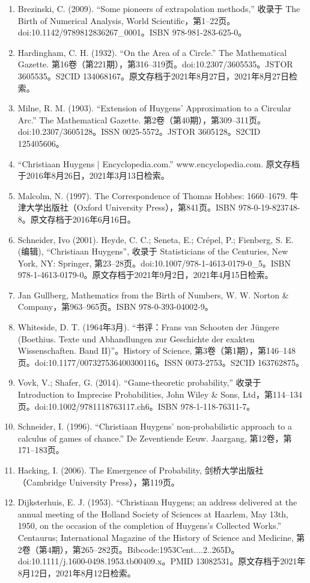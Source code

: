 \begin{enumerate}
\item Brezinski, C. (2009). “Some pioneers of extrapolation methods,” 收录于 The Birth of Numerical Analysis, World Scientific，第1–22页。doi:10.1142/9789812836267_0001。ISBN 978-981-283-625-0。
\item Hardingham, C. H. (1932). “On the Area of a Circle.” The Mathematical Gazette. 第16卷（第221期），第316–319页。doi:10.2307/3605535。JSTOR 3605535。S2CID 134068167。原文存档于2021年8月27日，2021年8月27日检索。
\item Milne, R. M. (1903). “Extension of Huygens’ Approximation to a Circular Arc.” The Mathematical Gazette. 第2卷（第40期），第309–311页。doi:10.2307/3605128。ISSN 0025-5572。JSTOR 3605128。S2CID 125405606。
\item “Christiaan Huygens | Encyclopedia.com.” www.encyclopedia.com. 原文存档于2016年8月26日，2021年3月13日检索。
\item Malcolm, N. (1997). The Correspondence of Thomas Hobbes: 1660–1679. 牛津大学出版社（Oxford University Press），第841页。ISBN 978-0-19-823748-8。原文存档于2016年6月16日。
\item Schneider, Ivo (2001). Heyde, C. C.; Seneta, E.; Crépel, P.; Fienberg, S. E. (编辑), “Christiaan Huygens”, 收录于 Statisticians of the Centuries, New York, NY: Springer, 第23–28页。doi:10.1007/978-1-4613-0179-0_5。ISBN 978-1-4613-0179-0。原文存档于2021年9月2日，2021年4月15日检索。
\item Jan Gullberg, Mathematics from the Birth of Numbers, W. W. Norton & Company，第963–965页。ISBN 978-0-393-04002-9。
\item Whiteside, D. T. (1964年3月). “书评：Frans van Schooten der Jüngere (Boethius. Texte und Abhandlungen zur Geschichte der exakten Wissenschaften. Band II)”。History of Science, 第3卷（第1期），第146–148页。doi:10.1177/007327536400300116。ISSN 0073-2753。S2CID 163762875。
\item Vovk, V.; Shafer, G. (2014). “Game-theoretic probability,” 收录于 Introduction to Imprecise Probabilities, John Wiley & Sons, Ltd，第114–134页。doi:10.1002/9781118763117.ch6。ISBN 978-1-118-76311-7。
\item Schneider, I. (1996). “Christiaan Huygens' non-probabilistic approach to a calculus of games of chance.” De Zeventiende Eeuw. Jaargang, 第12卷，第171–183页。
\item Hacking, I. (2006). The Emergence of Probability, 剑桥大学出版社（Cambridge University Press），第119页。
\item Dijksterhuis, E. J. (1953). “Christiaan Huygens; an address delivered at the annual meeting of the Holland Society of Sciences at Haarlem, May 13th, 1950, on the occasion of the completion of Huygens's Collected Works.” Centaurus; International Magazine of the History of Science and Medicine, 第2卷（第4期），第265–282页。Bibcode:1953Cent....2..265D。doi:10.1111/j.1600-0498.1953.tb00409.x。PMID 13082531。原文存档于2021年8月12日，2021年8月12日检索。

\end{enumerate}
